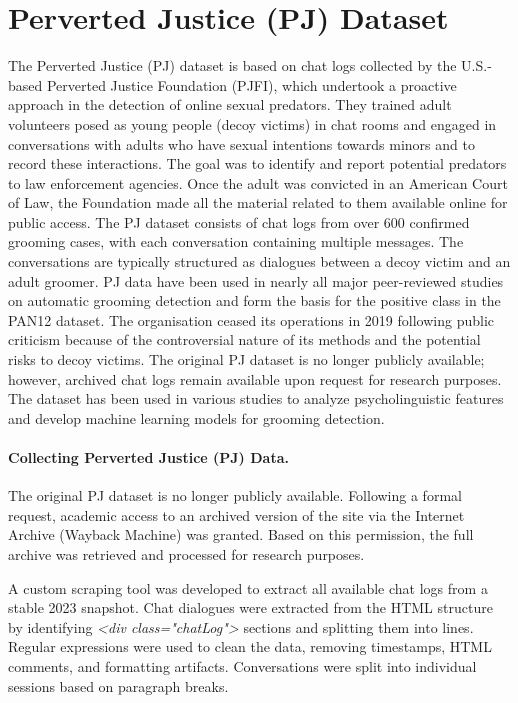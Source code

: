 \section{Perverted Justice (PJ) Dataset}
The Perverted Justice (PJ) dataset is based on chat logs collected by the U.S.-based Perverted Justice Foundation (PJFI), which undertook a proactive approach in the detection of online sexual predators. They trained adult volunteers
posed as young people (decoy victims) in chat rooms and engaged in conversations with adults who have sexual intentions towards minors and to record these interactions. The goal was to identify and report potential predators to law enforcement agencies. Once the adult was convicted in an American Court of Law, the Foundation made all the material related to them available online for public access. The PJ dataset consists of chat logs from over 600 confirmed grooming cases, with each conversation containing multiple messages. The conversations are typically structured as dialogues between a decoy victim and an adult groomer. PJ data have been used in nearly all major peer-reviewed studies on automatic grooming detection and form the basis for the positive class in the PAN12 dataset.  
The organisation ceased its operations in 2019 following public criticism because of the controversial nature of its methods and the potential risks to decoy victims. The original PJ dataset is no longer publicly available; however, archived chat logs remain available upon request for research purposes.
 The dataset has been used in various studies to analyze psycholinguistic features and develop machine learning models for grooming detection.


\paragraph{Collecting Perverted Justice (PJ) Data.}
The original PJ dataset is no longer publicly available. Following a formal request, academic access to an archived version of the site via the Internet Archive (Wayback Machine) was granted. Based on this permission, the full archive was retrieved and processed for research purposes.

A custom scraping tool was developed to extract all available chat logs from a stable 2023 snapshot. Chat dialogues were extracted from the HTML structure by identifying \textit{<div class="chatLog">} sections and splitting them into lines. Regular expressions were used to clean the data, removing timestamps, HTML comments, and formatting artifacts. Conversations were split into individual sessions based on paragraph breaks.


